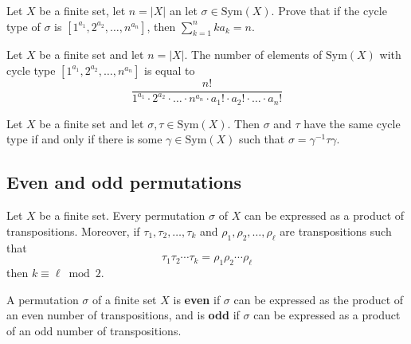
\begin{exercise}
Let $X$ be a finite set, let $n = |X|$ an let $\sigma \in \mathrm{Sym}(X)$. Prove that if the cycle type of $\sigma$ is $[1^{a_1}, 2^{a_2}, \dots, n^{a_n}]$, then $\displaystyle \sum_{k=1}^n ka_k = n$.
\end{exercise}

\begin{proposition}
Let $X$ be a finite set and let $n = |X|$. The number of elements of $\mathrm{Sym}(X)$ with cycle type $[1^{a_1}, 2^{a_2}, \dots, n^{a_n}]$ is equal to
\[ \frac{n!}{1^{a_1} \cdot 2^{a_2} \cdot \dots \cdot n^{a_n} \cdot a_1! \cdot a_2! \cdot \dots \cdot a_n!} \]
\end{proposition}

\begin{cproof}
\todo{}
\end{cproof}

\todo{}

\begin{theorem}
Let $X$ be a finite set and let $\sigma, \tau \in \mathrm{Sym}(X)$. Then $\sigma$ and $\tau$ have the same cycle type if and only if there is some $\gamma \in \mathrm{Sym}(X)$ such that $\sigma = \gamma^{-1} \tau \gamma$.
\end{theorem}

\begin{cproof}
\todo{}
\end{cproof}

\todo{}

\subsection*{Even and odd permutations}

\begin{theorem}
\label{thmProductOfTranspositions}
Let $X$ be a finite set. Every permutation $\sigma$ of $X$ can be expressed as a product of transpositions. Moreover, if $\tau_1, \tau_2, \dots, \tau_k$ and $\rho_1, \rho_2, \dots, \rho_{\ell}$ are transpositions such that
\[ \tau_1 \tau_2 \cdots \tau_k = \rho_1 \rho_2 \cdots \rho_{\ell} \]
then $k \equiv \ell \bmod 2$.
\end{theorem}

\begin{cproof}
\todo{}
\end{cproof}

\todo{}

\begin{definition}
\label{defEvenOddPermutation}
A permutation $\sigma$ of a finite set $X$ is \textbf{even} if $\sigma$ can be expressed as the product of an even number of transpositions, and is \textbf{odd} if $\sigma$ can be expressed as a product of an odd number of transpositions.
\end{definition}

